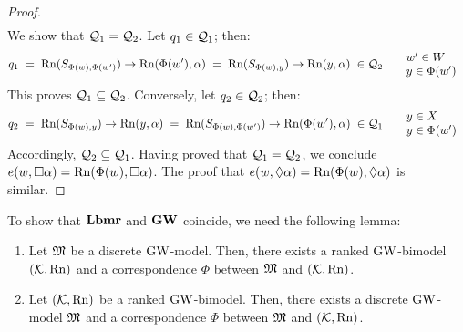 \begin{proof}
\[\begin{array}{rcll}
    \end{array}
\]
We show that  $\mathcal{Q}_1=\mathcal{Q}_2$.
Let $q_1\in \mathcal{Q}_1$; then:
\[
q_1\;=\;
  \Rnof{S_{\Phi(w),\Phi(w')} } \to \Rnof{\Phi(w'),\a}    
  \;=\;
  \Rnof{S_{\Phi(w),y}}\to  \Rnof{y,\a}
\;\in\Qcal_2  
\qquad
\begin{minipage}{5em}
    $w'\in W$
    \\
    $y\in \Phi(w')$
\end{minipage}
\]  
This proves $\mathcal{Q}_1\subseteq \mathcal{Q}_2$.
Conversely, let $q_2\in\mathcal{Q}_2$; then:
\[
q_2\;=\;   \Rnof{S_{\Phi(w),y}}\to  \Rnof{y,\a} 
\;=\;
  \Rnof{S_{\Phi(w),\Phi(w')} } \to \Rnof{\Phi(w'),\a}  \;\in\Qcal_1
  \qquad
  \begin{minipage}{5em}
    $y\in X$
    \\
   $y\in \Phi(w')$
\end{minipage}
\]
Accordingly, $\mathcal{Q}_2\subseteq \mathcal{Q}_1$.
Having proved that $\mathcal{Q}_1=\mathcal{Q}_2$, we conclude
 $e(w,\Box \alpha)  = \mathrm{Rn}(\Phi(w),\Box \alpha)$. 
 The proof that  $e(w,\lozenge \alpha)  = \mathrm{Rn}(\Phi(w),\lozenge \alpha)$ is similar.
\end{proof}




To show that $\mathbf{Lbmr}$ and $\mathbf{GW}$ coincide, we need the following lemma:

\begin{lemma}\label{lemma:Phi}
\text{}
  \begin{enumerate}[label=(\roman*), ref=(\roman*),leftmargin=*]
  \item\label{lemma:Phi:MtoK} Let $\mathfrak{M}$ be a discrete
    $\mbox{$\mathrm{GW}$}$-model.  Then, there exists a ranked $\mbox{$\mathrm{GW}$}$-bimodel
    $(\mathcal{K},\mathrm{Rn})$ and a correspondence $\Phi$ between $\mathfrak{M}$ and
    $(\mathcal{K},\mathrm{Rn})$.
    
  \item\label{lemma:Phi:KtoM}
    Let  $(\mathcal{K},\mathrm{Rn})$ be a  ranked  $\mbox{$\mathrm{GW}$}$-bimodel.
    Then, there exists  a  discrete $\mbox{$\mathrm{GW}$}$-model  $\mathfrak{M}$ and
    a correspondence $\Phi$ between $\mathfrak{M}$ and  $(\mathcal{K},\mathrm{Rn})$.
  \end{enumerate}
  
\end{lemma}



